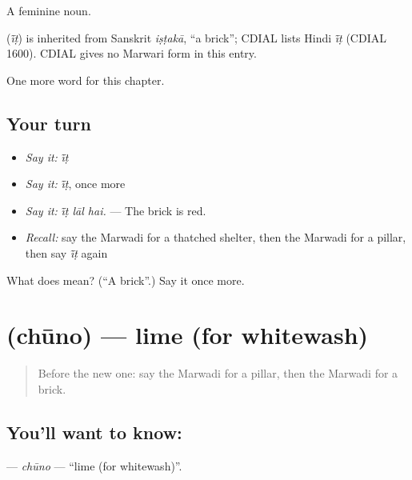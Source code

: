 A feminine noun.

\begin{cousinweb}
\textbf{} (\emph{ī̃ṭ}) is inherited from Sanskrit \emph{iṣṭakā}, \textquotedblleft{}a brick\textquotedblright{}; CDIAL lists Hindi \emph{ī̃ṭ} (CDIAL 1600). CDIAL gives no Marwari form in this entry.
\end{cousinweb}

\begin{grammarlens}[title={What you've built}]
One more word for this chapter.
\end{grammarlens}

\subsection*{Your turn}
\begin{itemize}
\raggedright
  \item \emph{Say it:} \emph{ī̃ṭ}
  \item \emph{Say it:} \emph{ī̃ṭ}, once more
  \item \emph{Say it:} \emph{ī̃ṭ lāl hai.} — The brick is red.
  \item \emph{Recall:} say the Marwadi for a thatched shelter, then the Marwadi for a pillar, then say \emph{ī̃ṭ} again
\end{itemize}

\begin{tcolorbox}[breakable,colback=teal!4,colframe=teal!35!black,title={Before you move on}]
What does  mean? (\textquotedblleft{}A brick\textquotedblright{}.) Say it once more.
\end{tcolorbox}
\section[\texorpdfstring{\mw{चूनो} (chūno)}{चूनो (chūno)}]{ (chūno) — lime (for whitewash)}

\label{lesson:MW-C189-chuno}



\begin{quote}
Before the new one: say the Marwadi for a pillar, then the Marwadi for a brick.
\end{quote}

\subsection*{You'll want to know: }
\textbf{} — \emph{chūno} — \textquotedblleft{}lime (for whitewash)\textquotedblright{}.

